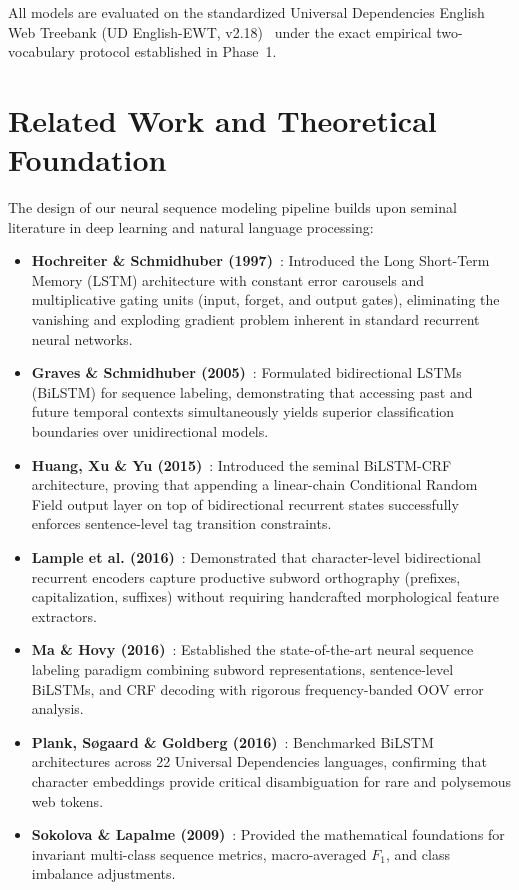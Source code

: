 \documentclass[conference]{IEEEtran}
\begin{document}
All models are evaluated on the standardized Universal Dependencies English Web Treebank (UD English-EWT, v2.18)~\cite{nivre2020universal} under the exact empirical two-vocabulary protocol established in Phase~1.

\section{Related Work and Theoretical Foundation}
The design of our neural sequence modeling pipeline builds upon seminal literature in deep learning and natural language processing:

\begin{itemize}
    \item \textbf{Hochreiter \& Schmidhuber (1997)}~\cite{hochreiter1997lstm}: Introduced the Long Short-Term Memory (LSTM) architecture with constant error carousels and multiplicative gating units (input, forget, and output gates), eliminating the vanishing and exploding gradient problem inherent in standard recurrent neural networks.
    \item \textbf{Graves \& Schmidhuber (2005)}~\cite{graves2005framewise}: Formulated bidirectional LSTMs (BiLSTM) for sequence labeling, demonstrating that accessing past and future temporal contexts simultaneously yields superior classification boundaries over unidirectional models.
    \item \textbf{Huang, Xu \& Yu (2015)}~\cite{huang2015bidirectional}: Introduced the seminal BiLSTM-CRF architecture, proving that appending a linear-chain Conditional Random Field output layer on top of bidirectional recurrent states successfully enforces sentence-level tag transition constraints.
    \item \textbf{Lample et al. (2016)}~\cite{lample2016neural}: Demonstrated that character-level bidirectional recurrent encoders capture productive subword orthography (prefixes, capitalization, suffixes) without requiring handcrafted morphological feature extractors.
    \item \textbf{Ma \& Hovy (2016)}~\cite{ma2016end}: Established the state-of-the-art neural sequence labeling paradigm combining subword representations, sentence-level BiLSTMs, and CRF decoding with rigorous frequency-banded OOV error analysis.
    \item \textbf{Plank, S{\o}gaard \& Goldberg (2016)}~\cite{plank2016multilingual}: Benchmarked BiLSTM architectures across 22 Universal Dependencies languages, confirming that character embeddings provide critical disambiguation for rare and polysemous web tokens.
    \item \textbf{Sokolova \& Lapalme (2009)}~\cite{sokolova2009systematic}: Provided the mathematical foundations for invariant multi-class sequence metrics, macro-averaged $F_1$, and class imbalance adjustments.
\end{itemize}
\end{document}
